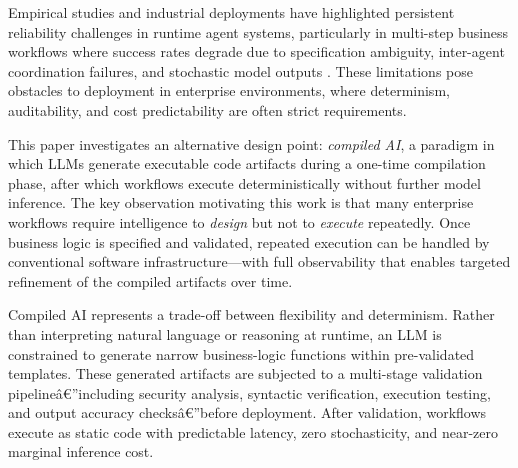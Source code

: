 \documentclass[11pt]{article}
\begin{document}
Empirical studies and industrial deployments have highlighted persistent reliability challenges in runtime agent systems, particularly in multi-step business workflows where success rates degrade due to specification ambiguity, inter-agent coordination failures, and stochastic model outputs \citep{cemri2025multiagent, atil2024nondeterminism}. These limitations pose obstacles to deployment in enterprise environments, where determinism, auditability, and cost predictability are often strict requirements.

This paper investigates an alternative design point: \emph{compiled AI}, a paradigm in which LLMs generate executable code artifacts during a one-time compilation phase, after which workflows execute deterministically without further model inference. The key observation motivating this work is that many enterprise workflows require intelligence to \emph{design} but not to \emph{execute} repeatedly. Once business logic is specified and validated, repeated execution can be handled by conventional software infrastructure---with full observability that enables targeted refinement of the compiled artifacts over time.

Compiled AI represents a trade-off between flexibility and determinism. Rather than interpreting natural language or reasoning at runtime, an LLM is constrained to generate narrow business-logic functions within pre-validated templates. These generated artifacts are subjected to a multi-stage validation pipelineâ€”including security analysis, syntactic verification, execution testing, and output accuracy checksâ€”before deployment. After validation, workflows execute as static code with predictable latency, zero stochasticity, and near-zero marginal inference cost.
\end{document}
